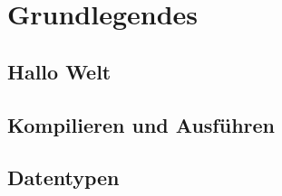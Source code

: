 \section{Grundlegendes}

\subsection{Hallo Welt}

\subsection{Kompilieren und Ausführen}

\subsection{Datentypen}
